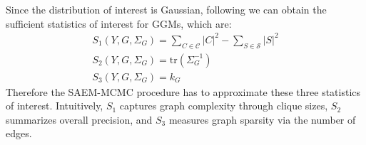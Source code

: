 Since the distribution of interest is Gaussian, following \textcite{donnet2012empirical} we can obtain the sufficient statistics of interest for GGMs, which are:
\begin{equation}
    \begin{gathered}
        S_1(Y, G , \Sigma_G) = \sum_{C\in\mathcal{C}} |C|^2 - \sum_{S\in\mathcal{S}}|S|^2\\
        S_2(Y, G , \Sigma_G) = \text{tr}(\Sigma_G^{-1})\\
        S_3(Y, G , \Sigma_G) = k_G
    \end{gathered}
\end{equation}
Therefore the SAEM-MCMC procedure has to approximate these three statistics of interest. Intuitively, $S_1$ captures graph complexity through clique sizes, $S_2$ summarizes overall precision, and $S_3$ measures graph sparsity via the number of edges. 
